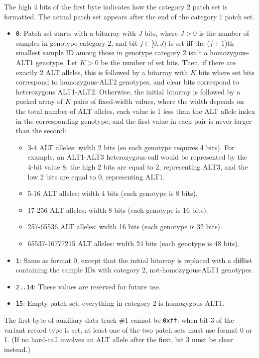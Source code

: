 \documentclass[8pt]{article}
\begin{document}
The high 4 bits of the first byte indicates how the category 2 patch set is
formatted.  The actual patch set appears after the end of the category 1 patch
set.

\begin{itemize}
\item \texttt{0}: Patch set starts with a bitarray with $J$ bits, where $J>0$
  is the number of samples in genotype category 2, and bit $j\in [0, J)$ is set
  iff the ($j+1$)th smallest sample ID among those in genotype category 2 isn't
  a homozygous-ALT1 genotype.  Let $K>0$ be the number of set bits.  Then, if
  there are exactly 2 ALT alleles, this is followed by a bitarray with $K$ bits
  where set bits correspond to homozygous-ALT2 genotypes, and clear bits
  correspond to heterozygous ALT1-ALT2.  Otherwise, the initial bitarray is
  followed by a packed array of $K$ pairs of fixed-width values, where the
  width depends on the total number of ALT alleles, each value is 1 less than
  the ALT allele index in the corresponding genotype, and the first value in
  each pair is never larger than the second:
  \begin{itemize}
  \item 3-4 ALT alleles: width 2 bits (so each genotype requires 4 bits).  For
    example, an ALT1-ALT3 heterozygous call would be represented by the 4-bit
    value 8: the high 2 bits are equal to 2, representing ALT3, and the low 2
    bits are equal to 0, representing ALT1.
  \item 5-16 ALT alleles: width 4 bits (each genotype is 8 bits).
  \item 17-256 ALT alleles: width 8 bits (each genotype is 16 bits).
  \item 257-65536 ALT alleles: width 16 bits (each genotype is 32 bits).
  \item 65537-16777215 ALT alleles: width 24 bits (each genotype is 48 bits).
  \end{itemize}
\item \texttt{1}: Same as format 0, except that the initial bitarray is
  replaced with a difflist containing the sample IDs with category 2,
  not-homozygous-ALT1 genotypes.
\item \texttt{2..14}: These values are reserved for future use.
\item \texttt{15}: Empty patch set; everything in category 2 is
  homozygous-ALT1.
\end{itemize}

The first byte of auxiliary data track \#1 cannot be \texttt{0xff}: when bit 3
of the variant record type is set, at least one of the two patch sets must use
format 0 or 1.  (If no hard-call involves an ALT allele after the first, bit 3
must be clear instead.)
\end{document}
